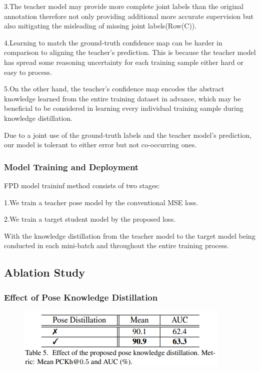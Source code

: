 \documentclass[11pt]{article}
\begin{document}
3.The teacher model may provide more complete joint labels than the original annotation therefore not only providing additional more accurate supervision but also mitigating the misleading of missing joint labels(Row(C)).

4.Learning to match the ground-truth confidence map can be harder in comparison to aligning the teacher’s prediction. This is because the teacher model has spread some reasoning uncertainty for each training sample either hard or easy to process.

5.On the other hand, the teacher’s confidence map encodes the abstract knowledge learned from the entire training dataset in advance, which may be beneficial to be considered in learning every individual training sample during knowledge distillation.

Due to a joint use of the ground-truth labels and the teacher model’s prediction, our model is tolerant to either error but not co-occurring ones.

\subsubsection{Model Training and Deployment}
FPD model traininf method consists of two stages:

\noindent1.We train a teacher pose model by the conventional MSE loss.

\noindent2.We train a target student model by the proposed loss.

With the knowledge distillation from the teacher model to the target model being conducted in each mini-batch and throughout the entire training process.

\subsection{Ablation Study}
\subsubsection{Effect of Pose Knowledge Distillation}
\begin{figure}[H]
	\centering
	\includegraphics[scale = 0.5]{74}
\end{figure}
\end{document}
